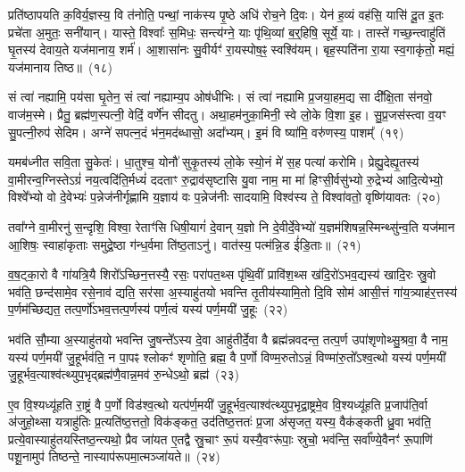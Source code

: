 प्रति॑\-ष्ठापयति क॒विर्य॒ज्ञस्य॒ वि त॑नोति॒ पन्थां॒ नाक॑स्य पृ॒ष्ठे अधि॑ रोच॒ने दि॒वः। येन॑ ह॒व्यं वह॑सि॒ यासि॑ दू॒त इ॒तः प्रचे॑ता अ॒मुतः॒ सनी॑यान्। यास्ते॒ विश्वाः᳚ स॒मिधः॒ सन्त्य॑ग्ने॒ याः पृ॑थि॒व्यां ब॒र्॒\mbox{}हिषि॒ सूर्ये॒ याः। तास्ते॑ गच्छ॒न्त्वाहु॑तिं घृ॒तस्य॑ देवाय॒ते यज॑मानाय॒ शर्म॑। आ॒शासा॑नः सु॒वीर्यꣳ॑ रा॒यस्पोष॒ꣴ॒ स्वश्वि॑यम्। बृह॒स्पति॑ना रा॒या स्व॒गाकृ॑तो॒ मह्यं॒ यज॑मानाय तिष्ठ॥~(१८)

{\anuvakamend[{स॒मा॒नाना॒मोष॑धीष्वे॒व प॒शून्मह्यं॒ यज॑माना॒यैक॑ञ्च}]}%

सं त्वा॑ नह्यामि॒ पय॑सा घृ॒तेन॒ सं त्वा॑ नह्याम्य॒प ओष॑धीभिः। सं त्वा॑ नह्यामि प्र॒जया॒हम॒द्य सा दी᳚क्षि॒ता स॑नवो॒ वाज॑म॒स्मे। प्रैतु॒ ब्रह्म॑ण॒स्पत्नी॒ वेदिं॒ वर्णे॑न सीदतु। अथा॒हम॑नुका॒मिनी॒ स्वे लो॒के वि॒शा इ॒ह। सु॒प्र॒जस॑स्त्वा व॒यꣳ सु॒पत्नी॒रुप॑ सेदिम। अग्ने॑ सपत्न॒दं भ॑न॒मद॑ब्धासो॒ अदा᳚भ्यम्। इ॒मं वि ष्या॑मि॒ वरु॑णस्य॒ पाशम्᳚~(१९)

यमब॑ध्नीत सवि॒ता सु॒केतः॑। धा॒तुश्च॒ योनौ॑ सुकृ॒तस्य॑ लो॒के स्यो॒नं मे॑ स॒ह पत्या॑ करोमि। प्रेह्यु॒देह्यृ॒तस्य॑ वा॒मीरन्व॒ग्निस्ते\-ऽग्रं॑ नय॒त्वदि॑ति॒र्मध्यं॑ ददताꣳ रु॒द्राव॑सृष्टासि यु॒वा नाम॒ मा मा॑ हिꣳसी॒र्वसु॑भ्यो रु॒द्रेभ्य॑ आदि॒त्येभ्यो॒ विश्वे᳚भ्यो वो दे॒वेभ्यः॑ प॒न्नेज॑नीर्गृह्णामि य॒ज्ञाय॑ वः प॒न्नेज॑नीः सादयामि॒ विश्व॑स्य ते॒ विश्वा॑वतो॒ वृष्णि॑यावतः~(२०)

तवा᳚ग्ने वा॒मीरनु॑ स॒न्दृशि॒ विश्वा॒ रेताꣳ॑सि धिषी॒यागं॑ दे॒वान् य॒ज्ञो नि दे॒वीर्दे॒वेभ्यो॑ य॒ज्ञम॑शिषन्न॒स्मिन्थ्सु॑न्व॒ति यज॑मान आ॒शिषः॒ स्वाहा॑कृताः समुद्रे॒ष्ठा ग॑न्ध॒र्वमा ति॑ष्ठ॒ता\-ऽनु॑। वात॑स्य॒ पत्म॑न्नि॒ड ई॑डि॒ताः॥~(२१)

{\anuvakamend[{पाशं॒ वृष्णि॑यावतस्त्रि॒ꣳ॒शच्च॑}]}%

व॒ष॒ट्का॒रो वै गा॑यत्रि॒यै शिरो᳚\-ऽच्छिन॒त्तस्यै॒ रसः॒ परा॑पत॒थ्स पृ॑थि॒वीं प्रावि॑श॒थ्स ख॑दि॒रो॑\-ऽभव॒द्यस्य॑ खादि॒रः स्रु॒वो भव॑ति॒ छन्द॑सामे॒व रसे॒नाव॑ द्यति॒ सर॑सा अ॒स्याहु॑तयो भवन्ति तृ॒तीय॑स्यामि॒तो दि॒वि सोम॑ आसी॒त्तं गा॑य॒त्र्याह॑र॒त्तस्य॑ प॒र्णम॑च्छिद्यत॒ तत्प॒र्णो॑\-ऽभव॒त्तत्प॒र्णस्य॑ पर्ण॒त्वं यस्य॑ पर्ण॒मयी॑ जु॒हूः~(२२)

भव॑ति सौ॒म्या अ॒स्याहु॑तयो भवन्ति जु॒षन्ते᳚\-ऽस्य दे॒वा आहु॑तीर्दे॒वा वै ब्रह्म॑न्नवदन्त॒ तत्प॒र्ण उपा॑शृणोथ्सु॒श्रवा॒ वै नाम॒ यस्य॑ पर्ण॒मयी॑ जु॒हूर्भव॑ति॒ न पा॒पꣴ श्लोकꣳ॑ शृणोति॒ ब्रह्म॒ वै प॒र्णो विण्म॒रुतो\-ऽन्नं॒ विण्मा॑रु॒तो᳚\-ऽश्व॒त्थो यस्य॑ पर्ण॒मयी॑ जु॒हूर्भव॒त्याश्व॑त्थ्युप॒भृद्ब्रह्म॑णै॒वान्न॒मव॑ रु॒न्धे\-ऽथो॒ ब्रह्म॑~(२३)

ए॒व वि॒श्यध्यू॑हति रा॒ष्ट्रं वै प॒र्णो विड॑श्व॒त्थो यत्प॑र्ण॒मयी॑ जु॒हूर्भव॒त्याश्व॑त्थ्युप॒भृद्रा॒ष्ट्रमे॒व वि॒श्यध्यू॑हति प्र॒जा\-प॑ति॒र्वा अ॑जुहो॒थ्सा यत्राहु॑तिः प्र॒त्यति॑ष्ठ॒त्ततो॒ विक॑ङ्कत॒ उद॑तिष्ठ॒त्ततः॑ प्र॒जा अ॑सृजत॒ यस्य॒ वैक॑ङ्कती ध्रु॒वा भव॑ति॒ प्रत्ये॒वास्याहु॑तयस्तिष्ठ॒न्त्यथो॒ प्रैव जा॑यत ए॒तद्वै स्रु॒चाꣳ रू॒पं यस्यै॒वꣳरू॑पाः॒ स्रुचो॒ भव॑न्ति॒ सर्वा᳚ण्ये॒वैनꣳ॑ रू॒पाणि॑ पशू॒नामुप॑ तिष्ठन्ते॒ नास्याप॑रूपमा॒त्मञ्जा॑यते॥~(२४)


